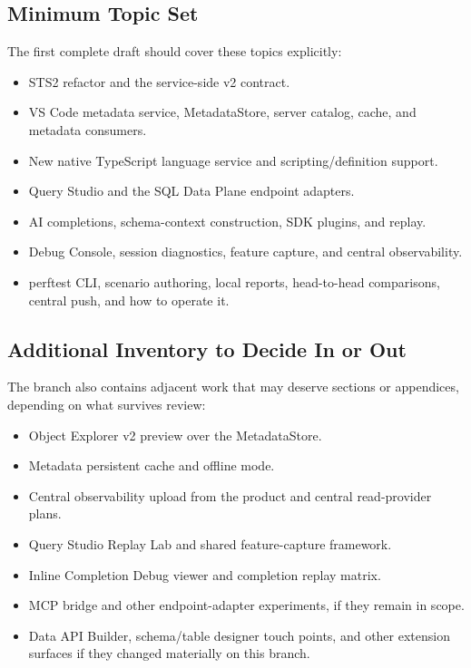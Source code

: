 \documentclass[11pt]{article}
\begin{document}
\subsection{Minimum Topic Set}

The first complete draft should cover these topics explicitly:

\begin{itemize}
	\item STS2 refactor and the service-side v2 contract.
	\item VS Code metadata service, MetadataStore, server catalog, cache, and metadata consumers.
	\item New native TypeScript language service and scripting/definition support.
	\item Query Studio and the SQL Data Plane endpoint adapters.
	\item AI completions, schema-context construction, SDK plugins, and replay.
	\item Debug Console, session diagnostics, feature capture, and central observability.
	\item perftest CLI, scenario authoring, local reports, head-to-head comparisons, central push, and how to operate it.
\end{itemize}

\subsection{Additional Inventory to Decide In or Out}

The branch also contains adjacent work that may deserve sections or appendices, depending on what survives review:

\begin{itemize}
	\item Object Explorer v2 preview over the MetadataStore.
	\item Metadata persistent cache and offline mode.
	\item Central observability upload from the product and central read-provider plans.
	\item Query Studio Replay Lab and shared feature-capture framework.
	\item Inline Completion Debug viewer and completion replay matrix.
	\item MCP bridge and other endpoint-adapter experiments, if they remain in scope.
	\item Data API Builder, schema/table designer touch points, and other extension surfaces if they changed materially on this branch.
\end{itemize}
\end{document}
